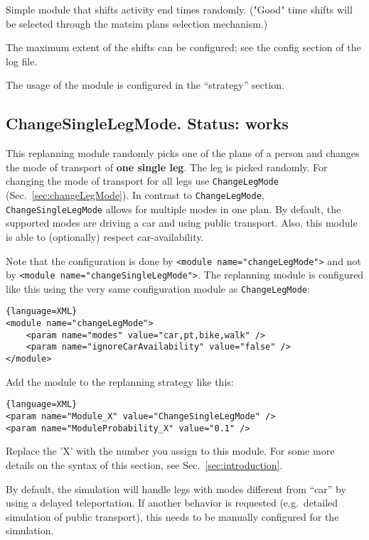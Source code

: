 Simple  module that shifts activity end times randomly. ("Good" time  shifts will be selected through the matsim plans selection mechanism.)

The maximum extent of the shifts can be configured; see the config  section of the log file. 

The usage of the module is configured in the ``strategy'' section.

\subsection{ChangeSingleLegMode. Status: works}


This replanning module randomly picks one of the plans of a person and changes the mode of transport of \textbf{one single leg}. The leg is picked randomly. For changing the mode of transport for all legs use \verb$ChangeLegMode$ (Sec.~\ref{sec:changeLegMode}). In contrast to \verb$ChangeLegMode$,  \verb$ChangeSingleLegMode$ allows for multiple modes in one plan. By default,  the supported modes are driving a car and using public transport. Also,  this module is able to (optionally) respect car-availability.

Note that the configuration is done by \verb$<module name="changeLegMode">$ and not by \verb$<module name="changeSingleLegMode">$. The replanning module is configured like  this using the very same configuration module as \verb$ChangeLegMode$:
\begin{lstlisting}{language=XML}
<module name="changeLegMode">
    <param name="modes" value="car,pt,bike,walk" />
    <param name="ignoreCarAvailability" value="false" />
</module>
\end{lstlisting}

Add the module to the replanning strategy like this:
\begin{lstlisting}{language=XML}
<param name="Module_X" value="ChangeSingleLegMode" />
<param name="ModuleProbability_X" value="0.1" />
\end{lstlisting}

Replace the 'X' with the number you assign to this module. For some more details on the syntax of this section, see Sec.~\ref{sec:introduction}.

By default, the simulation will handle legs with modes different from  ``car'' by using a delayed teleportation. If another behavior is  requested (e.g.\ detailed simulation of public transport), this needs to  be manually configured for the simulation.


